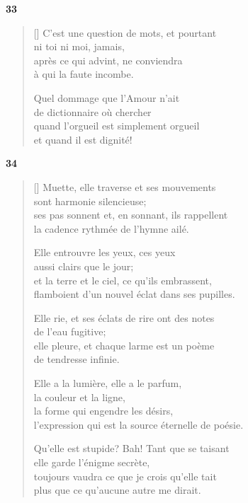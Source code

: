 \documentclass[a4paper,12pt]{book}
\begin{document}
\bigskip

\begin{center}
  \textbf{33}
\end{center}

\settowidth{\versewidth}{C'est une question de mots, et pourtant}

\begin{verse}[\versewidth]
  C'est une question de mots, et pourtant \\
  ni toi ni moi, jamais, \\
  après ce qui advint, ne conviendra \\
  à qui la faute incombe.

  Quel dommage que l'Amour n'ait \\
  de dictionnaire où chercher \\
  quand l'orgueil est simplement orgueil \\
  et quand il est dignité!
\end{verse}

\bigskip

\begin{center}
  \textbf{34}
\end{center}

\settowidth{\versewidth}{flamboient d'un nouvel éclat dans ses pupilles.}

\begin{verse}[\versewidth]
  Muette, elle traverse et ses mouvements \\
  sont harmonie silencieuse; \\
  ses pas sonnent et, en sonnant, ils rappellent \\
  la cadence rythmée de l'hymne ailé.

  Elle entrouvre les yeux, ces yeux \\
  aussi clairs que le jour; \\
  et la terre et le ciel, ce qu'ils embrassent, \\
  flamboient d'un nouvel éclat dans ses pupilles.

  Elle rie, et ses éclats de rire ont des notes \\
  de l'eau fugitive; \\
  elle pleure, et chaque larme est un poème \\
  de tendresse infinie.

  Elle a la lumière, elle a le parfum, \\
  la couleur et la ligne, \\
  la forme qui engendre les désirs, \\
  l'expression qui est la source éternelle de poésie.

  Qu'elle est stupide? Bah! Tant que se taisant \\
  elle garde l'énigme secrète, \\
  toujours vaudra ce que je crois qu'elle tait \\
  plus que ce qu'aucune autre me dirait.
\end{verse}
\end{document}
